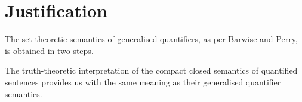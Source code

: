 \section{Justification}
\label{just}



The set-theoretic semantics of generalised quantifiers, as per Barwise and Perry, is obtained in two steps. 

\begin{proposition}
The truth-theoretic interpretation of the compact closed semantics of quantified sentences provides us with the same meaning as their generalised quantifier semantics.
\end{proposition}


